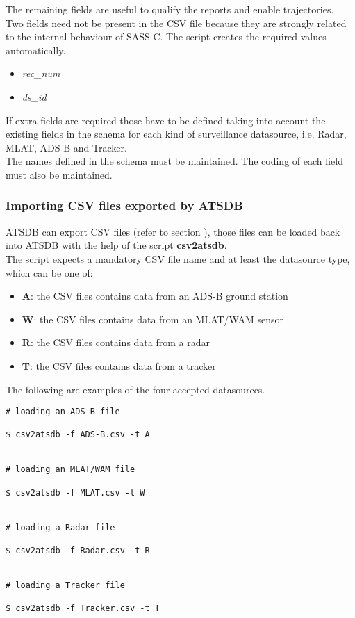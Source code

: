 The remaining fields are useful to qualify the reports and enable trajectories. \\

\newpage
Two fields need not be present in the CSV file because they are strongly related to the internal behaviour of SASS-C. The script creates the required values automatically.
\begin{itemize}
\item \textit{rec\_num}
\item \textit{ds\_id}
\\
\end{itemize}

If extra fields are required those have to be defined taking into account the existing fields in the schema for each kind of surveillance datasource, i.e. Radar, MLAT, ADS-B and Tracker. \\

The names defined in the schema must be maintained. The coding of each field must also be maintained.

\subsubsection{Importing CSV files exported by ATSDB}

ATSDB can export CSV files (refer to section ), those files can be loaded back into ATSDB with the help of the script \textbf{csv2atsdb}. \\

The script expects a mandatory CSV file name and at least the datasource type, which can be one of:
\label{sec:datasrc_type}
\begin{itemize}
\item \textbf{A}: the CSV files contains data from an ADS-B ground station
\item \textbf{W}: the CSV files contains data from an MLAT/WAM sensor
\item \textbf{R}: the CSV files contains data from a radar
\item \textbf{T}: the CSV files contains data from a tracker
\\
\end{itemize}

The following are examples of the four accepted datasources.

\begin{verbatim}
# loading an ADS-B file

$ csv2atsdb -f ADS-B.csv -t A


# loading an MLAT/WAM file

$ csv2atsdb -f MLAT.csv -t W


# loading a Radar file

$ csv2atsdb -f Radar.csv -t R


# loading a Tracker file

$ csv2atsdb -f Tracker.csv -t T
\end{verbatim}

